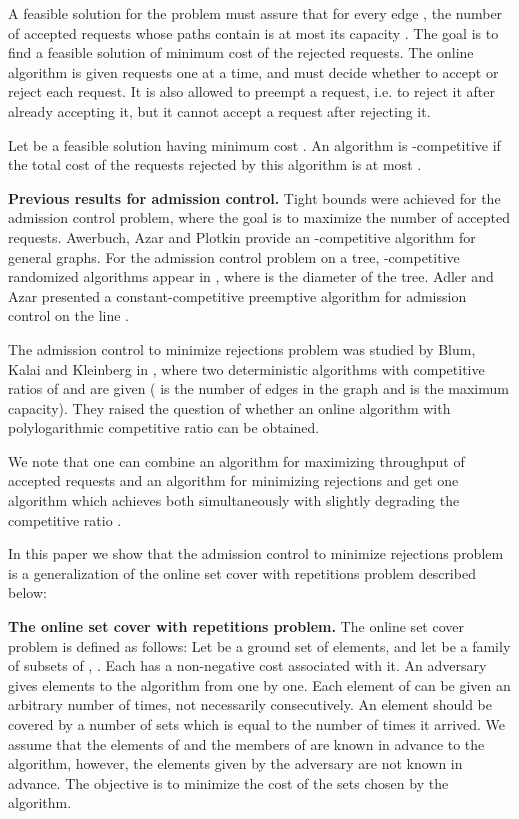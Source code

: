 \documentclass{sig-alternate}
\begin{document}
A feasible solution for the problem must assure that for every
edge , the number of accepted requests whose paths contain 
is at most its capacity . The goal is to find a feasible
solution of minimum cost of the rejected requests. The online
algorithm is given requests one at a time, and must decide whether
to accept or reject each request. It is also allowed to preempt a
request, i.e. to reject it after already accepting it, but it
cannot accept a request after rejecting it.

Let  be a feasible solution having minimum cost . An
algorithm is -competitive if the total cost of the requests
rejected by this algorithm is at most .

\textbf{Previous results for admission control.} Tight bounds were
achieved for the admission control problem, where the goal is to
maximize the number of accepted requests. Awerbuch, Azar and
Plotkin \cite{AAP93} provide an -competitive algorithm
for general graphs. For the admission control problem on a tree,
-competitive randomized algorithms appear in
\cite{ABFR94,AGLR94}, where  is the diameter of the tree. Adler
and Azar presented a constant-competitive preemptive algorithm for
admission control on the line \cite{AdAz03}.

The admission control to minimize rejections problem was studied
by Blum, Kalai and Kleinberg in \cite{BlKaKl01}, where two
deterministic algorithms with competitive ratios of 
and  are given ( is the number of edges in the graph and
 is the maximum capacity). They raised the question of whether
an online algorithm with polylogarithmic competitive ratio can be
obtained.

We note that one can combine an algorithm for maximizing
throughput of accepted requests and an algorithm for minimizing
rejections and get one algorithm which achieves both
simultaneously with slightly degrading the competitive ratio
\cite{ABM03,BM04}.

In this paper we show that the admission control to minimize
rejections problem is a generalization of the online set cover
with repetitions problem described below:

\textbf{The online set cover with repetitions problem.} The online
set cover problem is defined as follows: Let  be a ground set
of  elements, and let  be a family of subsets of ,
. Each  has a non-negative cost associated
with it. An adversary gives elements to the algorithm from  one
by one. Each element of  can be given an arbitrary number of
times, not necessarily consecutively. An element should be covered
by a number of sets which is equal to the number of times it
arrived. We assume that the elements of  and the members of
 are known in advance to the algorithm, however, the elements
given by the adversary are not known in advance. The objective is
to minimize the cost of the sets chosen by the algorithm.
\end{document}
